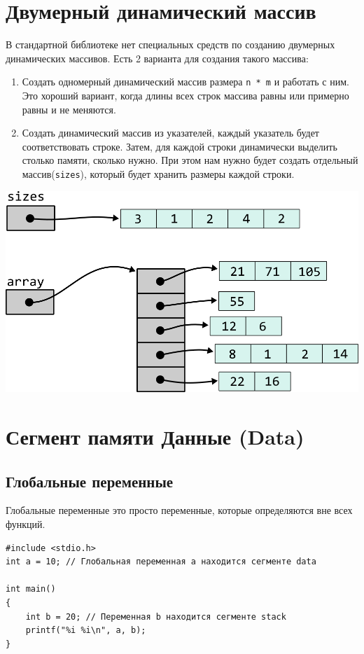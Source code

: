 \documentclass[10pt]{article}
\begin{document}
\section*{Двумерный динамический массив}
В стандартной библиотеке нет специальных средств по созданию
двумерных динамических массивов. Есть 2 варианта для создания
такого массива:
\begin{enumerate}
\item Создать одномерный динамический массив размера \texttt{n * m} и работать с ним.
Это хороший вариант, когда длины всех строк массива равны или примерно равны и не меняются.
\item Создать динамический массив из указателей, каждый указатель будет 
соответствовать строке. Затем, для каждой строки динамически выделить столько памяти,
сколько нужно. При этом нам нужно будет создать отдельный массив(\texttt{sizes}), который будет хранить
размеры каждой строки.
\end{enumerate}
\begin{center}
\includegraphics[scale=1]{../images/pointer_schemes/two_dim_dynamic_array.png}
\end{center}

\newpage
\section*{Сегмент памяти Данные (Data)}

\subsection*{Глобальные переменные}
Глобальные переменные это просто переменные, которые определяются вне всех функций.
\begin{lstlisting}
#include <stdio.h>
int a = 10; // Глобальная переменная a находится сегменте data

int main() 
{
    int b = 20; // Переменная b находится сегменте stack
    printf("%i %i\n", a, b);
}
\end{lstlisting}
\end{document}
